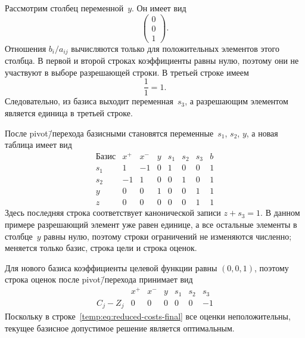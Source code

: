 Рассмотрим столбец переменной~$y$.
Он имеет вид
\begin{equation*}
  \begin{pmatrix}
    0 \\
    0 \\
    1
  \end{pmatrix}.
\end{equation*}
Отношения $b_i / a_{ij}$ вычисляются только для положительных элементов этого столбца.
В первой и второй строках коэффициенты равны нулю, поэтому они не участвуют в выборе разрешающей строки.
В третьей строке имеем
\begin{equation*}
  \frac{1}{1} = 1.
\end{equation*}
Следовательно, из базиса выходит переменная~$s_3$, а разрешающим элементом является единица в третьей строке.

После pivot\=/перехода базисными становятся переменные~$s_1$, $s_2$, $y$, а новая таблица имеет вид
\begin{equation*}
  \begin{array}{c|rrrrrr|r}
    \text{Базис} & x^+ & x^- & y & s_1 & s_2 & s_3 & b \\
    \hline
    s_1 & 1 & -1 & 0 & 1 & 0 & 0 & 1 \\
    s_2 & -1 & 1 & 0 & 0 & 1 & 0 & 1 \\
    y & 0 & 0 & 1 & 0 & 0 & 1 & 1 \\
    \hline
    z & 0 & 0 & 0 & 0 & 0 & 1 & 1
  \end{array}
\end{equation*}
Здесь последняя строка соответствует канонической записи $z + s_3 = 1$.
В данном примере разрешающий элемент уже равен единице, а все остальные элементы в столбце~$y$ равны нулю, поэтому строки ограничений не изменяются численно; меняется только базис, строка цели и строка оценок.

Для нового базиса коэффициенты целевой функции равны $(0, 0, 1)$, поэтому строка оценок после pivot\=/перехода принимает вид
\begin{equation}
  \begin{array}{c|rrrrrr}
     & x^+ & x^- & y & s_1 & s_2 & s_3 \\
    \hline
    C_j - Z_j & 0 & 0 & 0 & 0 & 0 & -1
  \end{array}
  \label{temp:eq:reduced-costs-final}
\end{equation}
Поскольку в строке~\eqref{temp:eq:reduced-costs-final} все оценки неположительны, текущее базисное допустимое решение является оптимальным.

